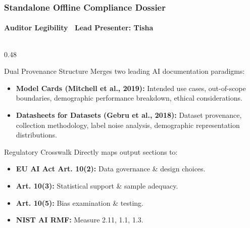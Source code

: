 \begin{frame}
  \frametitle{Standalone Offline Compliance Dossier}
  \framesubtitle{Auditor Legibility \textbar\ Lead Presenter: Tisha}

  \begin{columns}[T]
    \begin{column}{0.48\textwidth}
      \begin{card}{Dual Provenance Structure}
        \scriptsize
        Merges two leading AI documentation paradigms:
        \vspace{0.1cm}
        \begin{itemize}\scriptsize
          \item \textbf{Model Cards (Mitchell et al., 2019):} Intended use cases, out-of-scope boundaries, demographic performance breakdown, ethical considerations.
          \item \textbf{Datasheets for Datasets (Gebru et al., 2018):} Dataset provenance, collection methodology, label noise analysis, demographic representation distributions.
        \end{itemize}
      \end{card}

      \vspace{0.15cm}
      \begin{statcard}{Regulatory Crosswalk}
        \scriptsize
        Directly maps output sections to:
        \begin{itemize}\scriptsize
          \item \textbf{EU AI Act Art. 10(2):} Data governance \& design choices.
          \item \textbf{Art. 10(3):} Statistical support \& sample adequacy.
          \item \textbf{Art. 10(5):} Bias examination \& testing.
          \item \textbf{NIST AI RMF:} Measure 2.11, 1.1, 1.3.
        \end{itemize}
      \end{statcard}
    \end{column}


\end{columns}
\end{frame}
